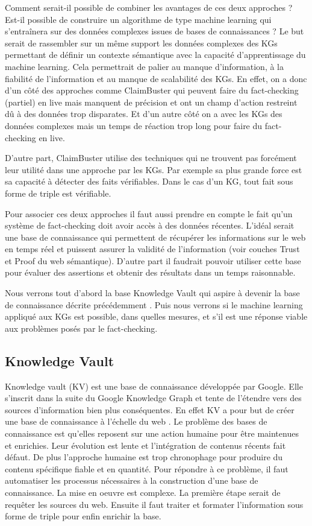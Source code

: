 Comment serait-il possible de combiner les avantages de ces deux approches ? Est-il possible de construire un algorithme de type machine learning qui s'entraînera sur des données complexes issues de bases de connaissances ? Le but serait de rassembler sur un même support les données complexes des KGs permettant de définir un contexte sémantique avec la capacité d'apprentissage du machine learning. Cela permettrait de palier au manque d'information, à la fiabilité de l'information et au manque de scalabilité des KGs. En effet, on a donc d'un côté des approches comme ClaimBuster qui peuvent faire du fact-checking (partiel) en live mais manquent de précision et ont un champ d'action restreint dû à des données trop disparates. Et d'un autre côté on a avec les KGs des données complexes mais un temps de réaction trop long pour faire du fact-checking en live.

D'autre part, ClaimBuster utilise des techniques qui ne trouvent pas forcément leur utilité dans une approche par les KGs. Par exemple sa plus grande force est sa capacité à détecter des faits vérifiables. Dans le cas d'un KG, tout fait sous forme de triple est vérifiable.

Pour associer ces deux approches il faut aussi prendre en compte le fait qu'un système de fact-checking doit avoir accès à des données récentes. L'idéal serait une base de connaissance qui permettent de récupérer les informations sur le web en temps réel et puissent assurer la validité de l'information (voir couches Trust et Proof du web sémantique). D'autre part il faudrait pouvoir utiliser cette base pour évaluer des assertions et obtenir des résultats dans un temps raisonnable.

Nous verrons tout d'abord la base Knowledge Vault qui aspire à devenir la base de connaissance décrite précédemment \cite{dong2014knowledge}. Puis nous verrons si le machine learning appliqué aux KGs est possible, dans quelles mesures, et s'il est une réponse viable aux problèmes posés par le fact-checking.

\subsection{Knowledge Vault}

Knowledge vault (KV) est une base de connaissance développée par Google. Elle s'inscrit dans la suite du Google Knowledge Graph et tente de l'étendre vers des sources d'information bien plus conséquentes. En effet KV a pour but de créer une base de connaissance à l'échelle du web \cite{dong2014knowledge}. Le problème des bases de connaissance est qu'elles reposent sur une action humaine pour être maintenues et enrichies. Leur évolution est lente et l'intégration de contenus récents fait défaut. De plus l'approche humaine est trop chronophage pour produire du contenu spécifique fiable et en quantité. Pour répondre à ce problème, il faut automatiser les processus nécessaires à la construction d'une base de connaissance. La mise en oeuvre est complexe. La première étape serait de requêter les sources du web. Ensuite il faut traiter et formater l'information sous forme de triple pour enfin enrichir la base.

